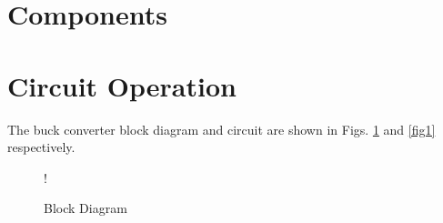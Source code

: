 \documentclass[journal,12pt,twocolumn]{IEEEtran}
\begin{document}
\section{Components}
\begin{table}[!h]
\centering

\caption{}
\label{table:components}
\end{table}

\section{Circuit Operation}
The buck converter block diagram and circuit are shown in Figs. \ref{fig:block} and \ref{fig1} respectively.
\begin{figure}[!h]
\centering
\resizebox {\columnwidth} {!} {

}
\caption{Block Diagram} 
\label{fig:block}
\end{figure}
\end{document}
